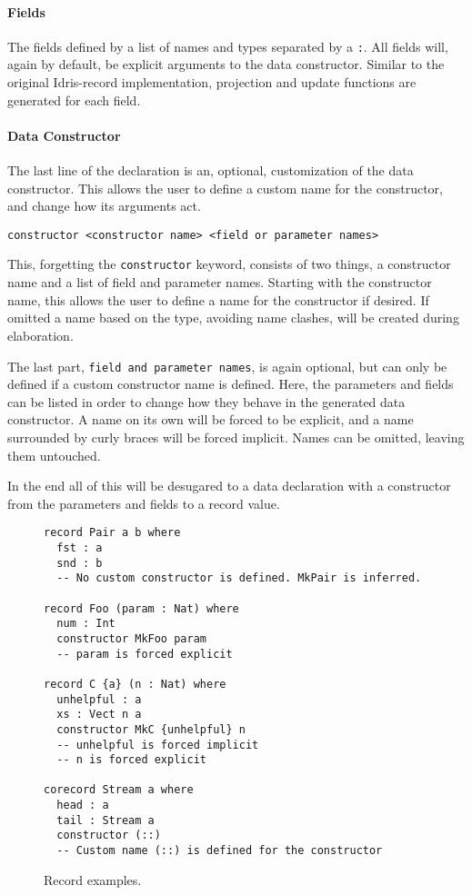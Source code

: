 \paragraph{Fields}
The fields defined by a list of names and types separated by a \texttt{:}. All
fields will, again by default, be explicit arguments to the data
constructor. Similar to the original Idris-record implementation, projection and
update functions are generated for each field.
\paragraph{Data Constructor}
The last line of the declaration is an, optional, customization of the data constructor. This
allows the user to define a custom name for the constructor, and change how its
arguments act.

\begin{lstlisting}
constructor <constructor name> <field or parameter names>
\end{lstlisting}

This, forgetting the \texttt{constructor} keyword, consists of two things, a
constructor name and a list of field and parameter names. Starting with the
constructor name, this allows the user to define a name for
the constructor if desired. If omitted a name
based on the type, avoiding name clashes, will be created during elaboration.

The last part, \texttt{field and parameter names}, is again optional, but can only be defined
if a custom constructor name is defined. Here,
the parameters and fields can be listed in order to change how they behave in the generated
data constructor. A name on its own will be forced to be explicit, and a
name surrounded by curly braces will be forced implicit. Names can be omitted,
leaving them untouched.

In the end all of this will be desugared to a data declaration with a
constructor from the parameters and fields to a record value.

\begin{figure}[h]
\begin{lstlisting}
record Pair a b where
  fst : a
  snd : b
  -- No custom constructor is defined. MkPair is inferred.

record Foo (param : Nat) where
  num : Int
  constructor MkFoo param 
  -- param is forced explicit 

record C {a} (n : Nat) where
  unhelpful : a
  xs : Vect n a
  constructor MkC {unhelpful} n
  -- unhelpful is forced implicit
  -- n is forced explicit

corecord Stream a where
  head : a
  tail : Stream a
  constructor (::) 
  -- Custom name (::) is defined for the constructor
\end{lstlisting}
  \caption{Record examples.}
  \label{fig:new_record_examples}
\end{figure}

